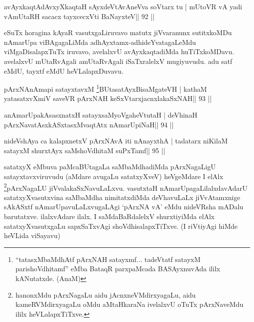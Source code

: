\begin{shl}
avAyxkaqtAdAvxyXkaqtaH sAyxdeVtAvAneVva soV\s tarx tu |
mUtoVR vA yadi vA\s mUtaRH sacacx tayxcecxVti BaNayxteV\hfill || 92 ||
\end{shl}

\begin{artha}
eSuTx horagina kAyaR vasutxgaLiruvavo matutx jiVvaranunx sutitxkoMDu
nAmarUpa viBAgagaLiMda adhAyxtamx-adhideYvatagaLeMdu viMgaDisalapxTuTx
iruvavo, avelalxvU avAyxkaqtadiMda huTiTxkoMDavu. avelalxvU
mUtaRvAgali amUtaRvAgali iSaTxralelxV mugiyuvudu. adu satf eMdU,
tayxtf eMdU heVLalapxDuvavu.
\end{artha}


\begin{shl}
pArxNAnAmapi satayxtavxM \footnote{``tatasxMbaMdhAtf pArxNAH satayxmf... tadeVtatf satayxM parishoVdhitamf'' eMba BataqR parxpaMcada BASAyxnuvAda ililx kANutatxde. (AnaM)}BUtasatAyxBisaMgateVH |
kathaM yatasatxvXmiV saveVR pArxNAH keSxVtarxjacnxlakaSxNAH\hfill || 93 ||
\end{shl}

\begin{shl}
anAmarUpakAsasxnatxH satayxsaMyoVgaheVtutaH |
deVhinaH pArxNavatAsxkASxtasxMvaqtAtx nAmarUpiNaH\hfill || 94 ||
\end{shl}

\begin{shl}
nideVshAya ca kalapxnetxV pArxNAvA iti nAnayxthA |
tadatarx niKilaM satayxM shurxtAyx saMshoVdhitaM suPxTamf\hfill || 95 ||
\end{shl}

\begin{artha}
satatxyX eMbuva paMcaBUtagaLa saMbaMdhadiMda pArxNagaLigU
satayxtavxviruvudu (aMdare avugaLu satatxyXveV) heVgeMdare I
elAlx \footnote{hanonxMdu pArxNagaLu aidu jAcnxneVMdirxyagaLu, aidu
kameRVMdirxyagaLu oMdu aMtaHkaraNa ivelalxvU oTuTx pArxNaveMdu ililx
heVLalapxTiTxve.}pArxNagaLU jiVvalakaSxNavuLaLxvu. vasutxtaH
nAmarUpagaLilalxdavAdarU satatxyXvasutxvina saMbaMdha nimitatxdiMda
deVhavuLaLx jiVvAtamxnige sAkASxtf nAmarUpavuLaLxvugaLAgi `pArxNA vA'
eMdu nideVRsha mADalu barutatxve. ilalxvAdare ilalx. I saMdaBaRdalelxV
shurxtiyiMda elAlx satatxyXvasutxgaLu sapxSaTxvAgi
shoVdhisalapxTiTxve. (I riVtiyAgi hiMde heVLida viSayavu)
\end{artha}


